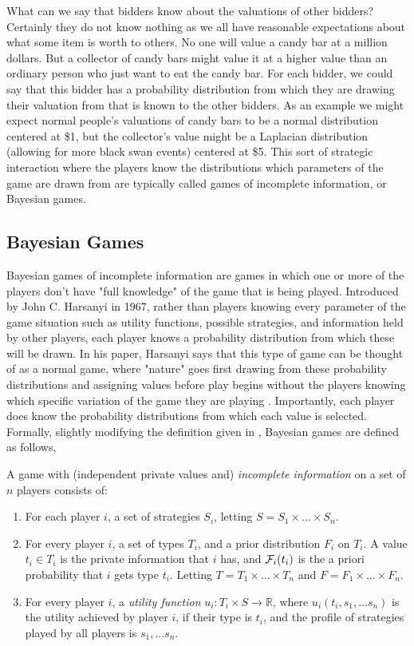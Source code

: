 \documentclass[12pt,twoside]{reedthesis}
\begin{document}
What can we say that bidders know about the valuations of other bidders? Certainly they do not know nothing as we all have reasonable expectations about what some item is worth to others. No one will value a candy bar at a million dollars. But a collector of candy bars might value it at a higher value than an ordinary person who just want to eat the candy bar. For each bidder, we could say that this bidder has a probability distribution from which they are drawing their valuation from that is known to the other bidders. As an example we might expect normal people's valuations of candy bars to be a normal distribution centered at \$1, but the collector's value might be a Laplacian distribution (allowing for more black swan events) centered at \$5. This sort of strategic interaction where the players know the distributions which parameters of the game are drawn from are typically called games of incomplete information, or Bayesian games.
 
\subsection{Bayesian Games}
Bayesian games of incomplete information are games in which one or more of the players don't have "full knowledge" of the game that is being played. Introduced by John C. Harsanyi in 1967, rather than players knowing every parameter of the game situation such as utility functions, possible strategies, and information held by other players, each player knows a probability distribution from which these will be drawn. In his paper, Harsanyi says that this type of game can be thought of as a normal game, where "nature" goes first drawing from these probability distributions and assigning values before play begins without the players knowing which specific variation of the game they are playing \citep{Harsanyi1967}. Importantly, each player does know the probability distributions from which each value is selected. Formally, slightly modifying the definition given in \citet{Nisan2007}, Bayesian games are defined as follows,

\begin{dfn}
	A game with (independent private values and) \textit{incomplete information} on a set of $n$ players consists of:
	\begin{enumerate}
		\item For each player $i$, a set of strategies $S_i$, letting $S = S_1 \times \ldots \times S_n$.
		\item For every player $i$, a set of types $T_i$, and a prior distribution $F_i$ on $T_i$. A value $t_i \in T_i$ is the private information that $i$ has, and $\mathcal{F}_i(t_i)$ is the a priori probability that $i$ gets type $t_i$. Letting $T = T_1 \times \ldots \times T_n$ and $F = F_1 \times \ldots \times F_n$.
		\item For every player $i$, a \textit{utility function} $u_i : T_i \times S \rightarrow \mathbb{R}$, where $u_i(t_i, s_1, \ldots s_n)$ is the utility achieved by player $i$, if their type is $t_i$, and the profile of strategies played by all players is $s_1, \ldots s_n$.
	\end{enumerate} 
\label{dfn:BayesianGame}
\end{dfn} 
\end{document}
